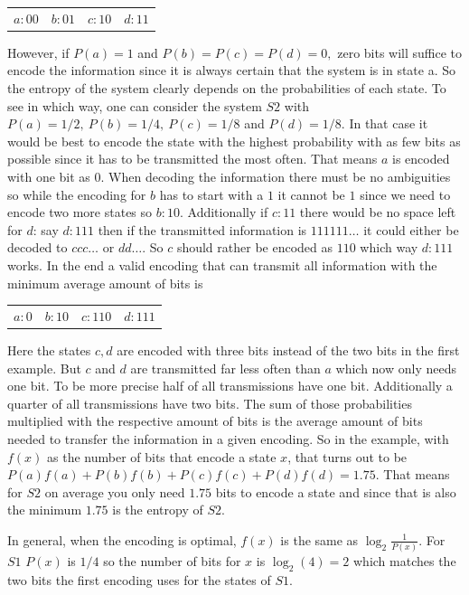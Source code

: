 \begin{center}
    \begin{tabular} {c c c c}
        $a: 00$ & $b: 01$ & $c: 10$ & $d: 11$
    \end{tabular}
\end{center}

However, if $P(a)=1$ and $P(b)=P(c)=P(d)=0,$ zero bits will suffice to encode the information since
it is always certain that the system is in state a. So the entropy of the system clearly depends on
the probabilities of each state. To see in which way, one can consider the system $S2$ with 
$P(a)=1/2,\ P(b)=1/4,\ P(c)=1/8$ and $P(d)=1/8$. In that case it would be best to encode the state
with the highest probability with as few bits as possible since it has to be transmitted the most
often. That means $a$ is encoded with one bit as $0$. When decoding the information there must be
no ambiguities so while the encoding for $b$ has to start with a $1$ it cannot be $1$ since we need 
to encode two more states so $b: 10$. Additionally if $c: 11$ there would be no space left for $d$:
say $d: 111$ then if the transmitted information is $111111\dots$ it could either be decoded to
$ccc\dots$ or $dd\dots$. So $c$ should rather be encoded as $110$ which way $d: 111$ works. In the end a valid
encoding that can transmit all information with the minimum average amount of bits is

\begin{center}
    \begin{tabular} {c c c c}
        $a: 0$ & $b: 10$ & $c: 110$ & $d: 111$
    \end{tabular}
\end{center}

Here the states $c, d$ are encoded with three bits instead of the two bits in the first example.
But $c$ and $d$ are transmitted far less often than $a$ which now only needs one bit. To be more precise
half of all transmissions have one bit. Additionally a quarter of all transmissions have two bits. 
The sum of those probabilities multiplied with the respective amount of bits is the average amount of bits
needed to transfer the information in a given encoding. So in the example, with $f(x)$ as the number of
bits that encode a state $x$, that turns out to be $P(a)f(a)+P(b)f(b)+P(c)f(c)+P(d)f(d)=1.75$.
That means for $S2$ on average you only need $1.75$ bits to encode a state and since that is also the
minimum $1.75$ is the entropy of $S2$.

In general, when the encoding is optimal, $f(x)$ is the same as $\log_{2} \frac{1}{P(x)}$. For $S1$ $P(x)$ is $1/4$
so the number of bits for $x$ is $\log_{2} (4)=2$ which matches the two bits the first encoding uses 
for the states of $S1$.

